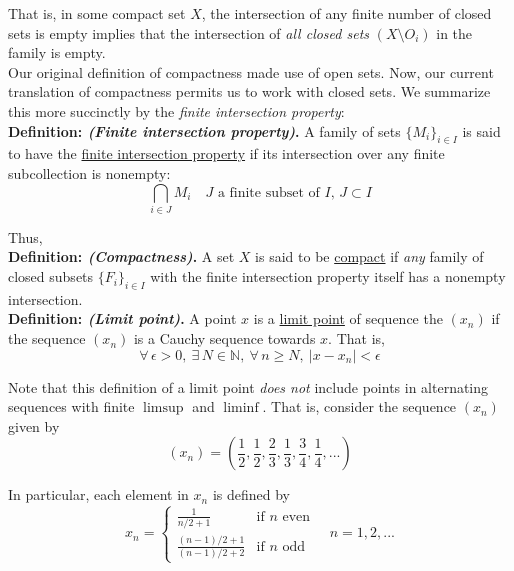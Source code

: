 \documentclass[12pt]{article}
\newlength\tindent
\renewcommand{\indent}{\hspace*{\tindent}}
\newcommand{\N}{\mathbb N}
\begin{document}
\indent That is, in some compact set $X$, the intersection of any finite number of closed sets is empty implies that the intersection of {\em all closed sets} $\left( X \setminus O_i \right)$ in the family is empty. \\

\indent Our original definition of compactness made use of open sets. Now, our current translation of compactness permits us to work with closed sets. We summarize this more succinctly by the {\em finite intersection property}: \\

%
%
{\bf Definition: {\em (Finite intersection property)}.} A family of sets $\{M_i\}_{i\in I}$ is said to have the \underline{finite intersection property} if its intersection over any finite subcollection is nonempty:
\begin{equation*}
	\bigcap_{i \in J} M_i \quad \text{$J$ a finite subset of $I$, $J \subset I$}
\end{equation*} 

Thus, \\

%
%
{\bf Definition: {\em (Compactness)}.} A set $X$ is said to be \underline{compact} if {\em any} family of closed subsets $\{F_i\}_{i \in I}$ with the finite intersection property itself has a nonempty intersection. \\

%
%
{\bf Definition: {\em (Limit point)}.} A point $x$ is a \underline{limit point} of sequence the $(x_n)$ if the sequence $(x_n)$ is a Cauchy sequence towards $x$. That is,
\begin{equation*}
	\forall\,\epsilon > 0,~\exists\,N\in\N,~\forall\,n\geq N,~ |x - x_n| < \epsilon
\end{equation*}

\indent Note that this definition of a limit point {\em does not} include points in alternating sequences with finite $\limsup$ and $\liminf$. That is, consider the sequence $(x_n)$ given by
\begin{equation*}
	(x_n) = \left( \frac{1}{2}, \frac{1}{2}, \frac{2}{3}, \frac{1}{3}, \frac{3}{4}, \frac{1}{4}, ... \right)
\end{equation*}

In particular, each element in $x_n$ is defined by
\begin{equation*}
	x_n = 
	\begin{cases}
		\frac{1}{n/2 + 1} & \text{if $n$ even} \\
		\frac{(n - 1)/2 + 1}{ (n - 1)/2 + 2 } & \text{if $n$ odd}
	\end{cases} \quad n = 1, 2, ...
\end{equation*}
\end{document}
